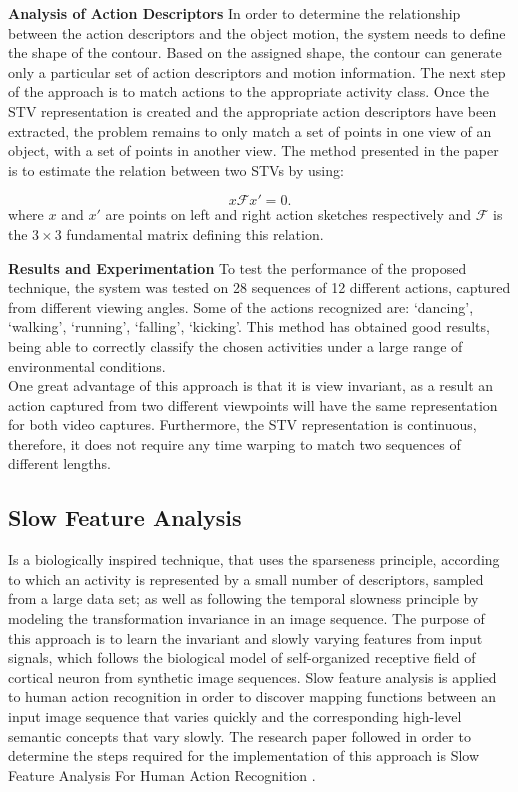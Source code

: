 \documentclass[11pt]{report}
\begin{document}
\textbf{Analysis of Action Descriptors}
In order to determine the relationship between the action descriptors and the object motion, the system needs to define the shape of the contour. Based on the assigned shape, the contour can generate only a particular set of action descriptors and motion information. 
The next step of the approach is to match actions to the appropriate activity class. Once the STV representation is created and the appropriate action descriptors have been extracted, the problem remains to only match a set of points in one view of an object, with a set of points in another view. The method presented in the paper is to estimate the relation between two STVs by using:

\begin{equation}
x \mathcal{F} x' = 0.
\end{equation}
where \(x\) and \(x'\) are points on left and right action sketches respectively and \( \mathcal{F}\) is the \(3 \times 3\) fundamental matrix defining this relation.

\textbf{Results and Experimentation}
To test the performance of the proposed technique, the system was tested on 28 sequences of 12 different actions, captured from different viewing angles. Some of the actions recognized are: `dancing', `walking', `running', `falling', `kicking'. This method has obtained good results, being able to correctly classify the chosen activities under a large range of environmental conditions. \\
One great advantage of this approach is that it is view invariant, as  a result an action captured from two different viewpoints will have the same representation for both video captures. Furthermore, the STV representation is continuous, therefore, it does not require any time warping to match two sequences of different lengths.\\

\subsection{Slow Feature Analysis}
Is a biologically inspired technique, that uses the sparseness principle, according to which an activity is represented by a small number of descriptors, sampled from a large data set; as well as following the temporal slowness principle by modeling the transformation invariance in an image sequence. The purpose of this approach is to learn the invariant and slowly varying features from input signals, which follows the biological model of self-organized receptive field of cortical neuron from synthetic image sequences. Slow feature analysis is applied to human action recognition in order to discover mapping functions between an input image sequence that varies quickly and the corresponding high-level semantic concepts that vary slowly. The research paper followed in order to determine the steps required for the implementation of this approach is Slow Feature Analysis For Human Action Recognition \cite{main}. \\
\end{document}
